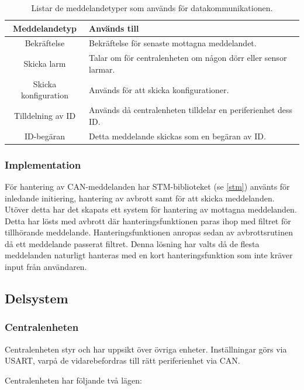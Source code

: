 \documentclass{article}
\begin{document}
\begin{table}[H]
	\centering
	\begin{tabular}{|c|p{}|}
		\hline
		Meddelandetyp & Används till \\ \hline \hline
		Bekräftelse		& Bekräftelse för senaste mottagna meddelandet. \\ \hline
		Skicka larm		& Talar om för centralenheten om någon dörr eller sensor larmar. \\ \hline
		Skicka konfiguration		& Används för att skicka konfigurationer. \\ \hline
		Tilldelning av ID		& Används då centralenheten tilldelar en periferienhet dess ID. \\ \hline
		ID-begäran		& Detta meddelande skickas som en begäran av ID. \\ \hline

	\end{tabular}
	\caption{Listar de meddelandetyper som används för datakommunikationen.}
	\label{tab:meddelandetyper}
\end{table}


\subsubsection{Implementation}
För hantering av CAN-meddelanden har STM-biblioteket (se \ref{stm}) använts för inledande initiering, hantering av avbrott samt för att skicka meddelanden.
Utöver detta har det skapats ett system för hantering av mottagna meddelanden.
Detta har lösts med avbrott där hanteringsfunktionen paras ihop med filtret för tillhörande meddelande.
Hanteringsfunktionen anropas sedan av avbrottsrutinen då ett meddelande passerat filtret.
Denna lösning har valts då de flesta meddelanden naturligt hanteras med en kort hanteringsfunktion som inte kräver input från användaren.



\subsection{Delsystem }
\subsubsection{Centralenheten}
Centralenheten styr och har uppsikt över övriga enheter.
 Inställningar görs via USART, varpå de vidarebefordras till rätt periferienhet via CAN.

Centralenheten har följande två lägen:
\end{document}
